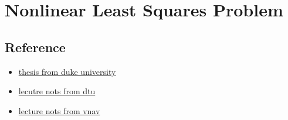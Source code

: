 \chapter{Nonlinear Least Squares Problem}\label{chp:nonlinear_least_Squares}

\section{Reference}
\begin{itemize}
    \item \href{https://people.duke.edu/~hpgavin/ExperimentalSystems/lm.pdf}{thesis from duke university}
    \item \href{https://www2.imm.dtu.dk/pubdb/edoc/imm3215.pdf}{lecutre nots from dtu}
    \item \href{https://vnav.mit.edu/material/17-18-NonLinearLeastSquares-notes.pdf}{lecture nots from vnav}
\end{itemize}